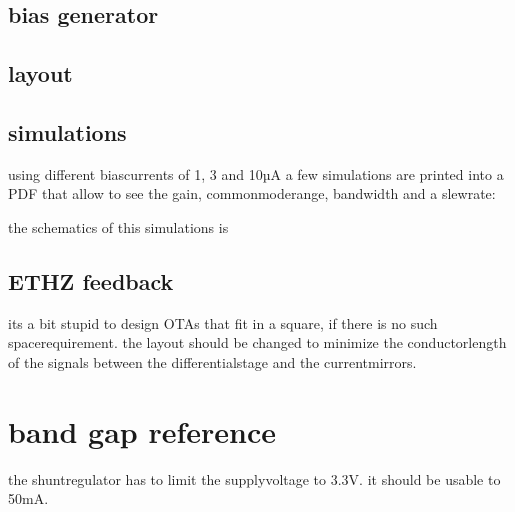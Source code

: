 \documentclass[letterpaper,10pt,english]{sphinxmanual}
\begin{document}
\section{bias generator}
\label{\detokenize{ota:bias-generator}}


\section{layout}
\label{\detokenize{ota:layout}}

\sphinxAtStartPar



\section{simulations}
\label{\detokenize{ota:simulations}}
\sphinxAtStartPar
using different bias\sphinxhyphen{}currents of 1, 3 and 10µA a few simulations are printed into a PDF that allow to see the gain, common\sphinxhyphen{}mode\sphinxhyphen{}range, bandwidth and a slew\sphinxhyphen{}rate:

\sphinxAtStartPar
{}

\sphinxAtStartPar
the schematics of this simulations is 


\section{ETHZ feedback}
\label{\detokenize{ota:ethz-feedback}}
\sphinxAtStartPar
its a bit stupid to design OTAs that fit in a square, if there is no such space\sphinxhyphen{}requirement. the layout should be changed to minimize the conductor\sphinxhyphen{}length of the signals between the differential\sphinxhyphen{}stage and the current\sphinxhyphen{}mirrors.

\sphinxstepscope


\chapter{band gap reference}
\label{\detokenize{reference:band-gap-reference}}\label{\detokenize{reference::doc}}
\sphinxAtStartPar
the shunt\sphinxhyphen{}regulator has to limit the supply\sphinxhyphen{}voltage to 3.3V. it should be usable to 50mA.
\end{document}
